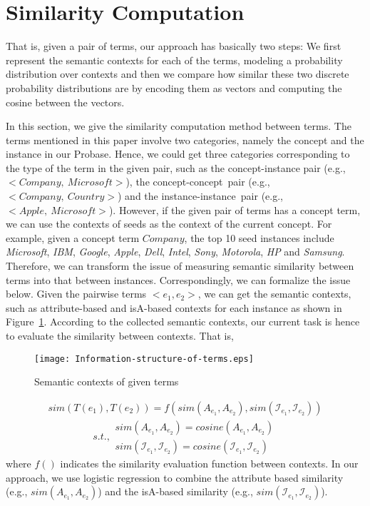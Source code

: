 \section{Similarity Computation}
That is, given a pair of terms, our approach has basically two steps: We first
represent the semantic contexts for each of the terms, modeling a probability distribution over contexts and then we compare how similar
these two discrete probability distributions are by encoding them as vectors and computing the cosine between the vectors.


In this section, we give the similarity computation method between terms.
The terms mentioned in this paper involve two categories, namely the concept and the instance in our Probase. Hence, we could get three categories corresponding to the type of the term in the given pair, such as the concept-instance pair (e.g.,~$<Company,~Microsoft>$), the concept-concept~pair (e.g.,~$<Company,~Country>$) and the instance-instance~pair (e.g.,~$<Apple,~Microsoft>$). However, if the given pair of terms has a concept term, we can use the contexts of seeds as the context of the current concept. For example, given a concept term $Company$, the top 10 seed instances include \emph{Microsoft}, \emph{IBM}, \emph{Google}, \emph{Apple}, \emph{Dell}, \emph{Intel}, \emph{Sony}, \emph{Motorola}, \emph{HP} and \emph{Samsung}. Therefore, we can transform the issue of measuring semantic similarity between terms into that between instances.
Correspondingly, we can formalize the issue below. Given the pairwise terms $<e_{1}, e_{2}>$, we can get the semantic contexts, such as attribute-based and isA-based contexts for each instance as shown in Figure~\ref{fig:Information-structure-of-terms}. According to the collected semantic contexts, our current task is hence to evaluate the similarity between contexts. That is,
\begin{figure}[t]
 \centerline{
 \texttt{[image: Information-structure-of-terms.eps]}}
\caption{Semantic contexts of given terms} \label{fig:Information-structure-of-terms}
\end{figure}
\begin{equation}
\begin{aligned}
sim(T(e_{1}), T(e_{2})) = f(sim(A_{e_{1}}, A_{e_{2}}), sim(\mathcal{I}_{e_{1}}, \mathcal{I}_{e_{2}}))
\label{eq:task1}
\end{aligned}
\end{equation}
\begin{displaymath}
{s.t.,
\begin{aligned}
sim(A_{e_{1}}, A_{e_{2}}) = cosine(A_{e_{1}}, A_{e_{2}})\\
sim(\mathcal{I}_{e_{1}}, \mathcal{I}_{e_{2}}) = cosine(\mathcal{I}_{e_{1}}, \mathcal{I}_{e_{2}})~~
\end{aligned}
}
\end{displaymath}
where $f()$ indicates the similarity evaluation function between contexts. In our approach, we use logistic regression to combine the attribute based similarity (e.g., $sim(A_{e_{1}}, A_{e_{2}})$) and the isA-based similarity (e.g., $sim(\mathcal{I}_{e_{1}}, \mathcal{I}_{e_{2}})$). 